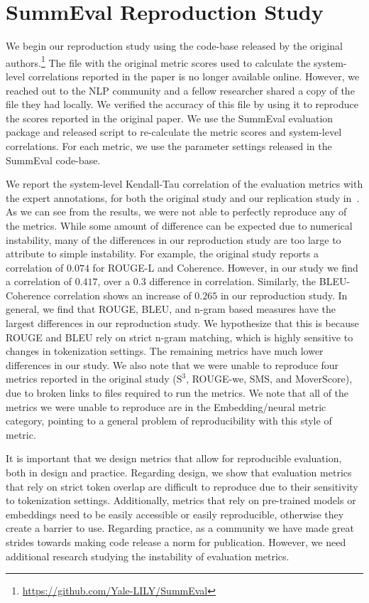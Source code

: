 
\section{SummEval Reproduction Study}\label{sec:6-chapter-summeval-repro}

We begin our reproduction study using the code-base released by the original authors.\footnote{\url{https://github.com/Yale-LILY/SummEval}} The file with the original metric scores used to calculate the system-level correlations reported in the paper is no longer available online. However, we reached out to the NLP community and a fellow researcher shared a copy of the file they had locally. We verified the accuracy of this file by using it to reproduce the scores reported in the original paper. We use the SummEval evaluation package and released script to re-calculate the metric scores and system-level correlations. For each metric, we use the parameter settings released in the SummEval code-base.

We report the system-level Kendall-Tau correlation of the evaluation metrics with the expert annotations, for both the original study and our replication study in~. As we can see from the results, we were not able to perfectly reproduce any of the metrics. While some amount of difference can be expected due to numerical instability, many of the differences in our reproduction study are too large to attribute to simple instability. For example, the original study reports a correlation of $0.074$ for ROUGE-L and Coherence. However, in our study we find a correlation of $0.417$, over a $0.3$ difference in correlation. Similarly, the BLEU-Coherence correlation shows an increase of $0.265$ in our reproduction study. In general, we find that ROUGE, BLEU, and n-gram based measures have the largest differences in our reproduction study. We hypothesize that this is because ROUGE and BLEU rely on strict n-gram matching, which is highly sensitive to changes in tokenization settings. The remaining metrics have much lower differences in our study. We also note that we were unable to reproduce four metrics reported in the original study ($\mathrm{S}^3$, ROUGE-we, SMS, and MoverScore), due to broken links to files required to run the metrics. We note that all of the metrics we were unable to reproduce are in the Embedding/neural metric category, pointing to a general problem of reproducibility with this style of metric.


It is important that we design metrics that allow for reproducible evaluation, both in design and practice. Regarding design, we show that evaluation metrics that rely on strict token overlap are difficult to reproduce due to their sensitivity to tokenization settings. Additionally, metrics that rely on pre-trained models or embeddings need to be easily accessible or easily reproducible, otherwise they create a barrier to use. Regarding practice, as a community we have made great strides towards making code release a norm for publication. However, we need additional research studying the instability of evaluation metrics.

\clearpage

